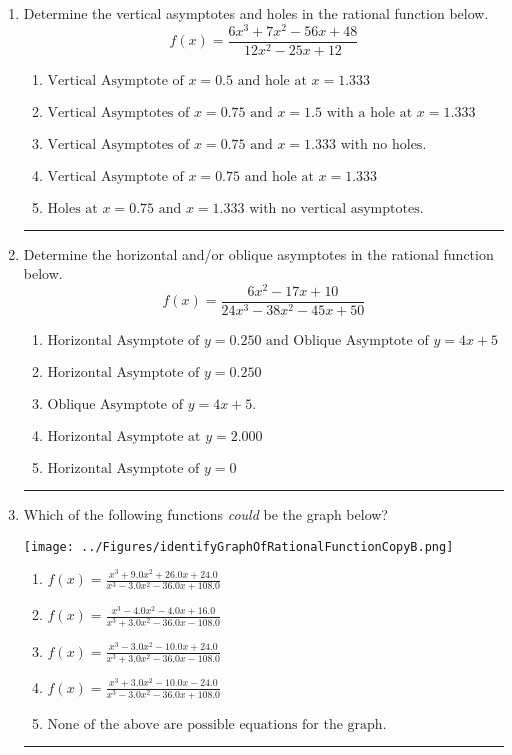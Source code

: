 \documentclass[14pt]{extbook}
\newcommand{\litem}[1]{\item#1\hspace*{-1cm}\rule{\textwidth}{0.4pt}}
\begin{document}
\begin{enumerate}
{\begin{enumerate}[label=\Alph*.]
\end{enumerate} }
\litem{
Determine the vertical asymptotes and holes in the rational function below.\[ f(x) = \frac{6x^{3} +7 x^{2} -56 x + 48}{12x^{2} -25 x + 12} \]\begin{enumerate}[label=\Alph*.]
\item \( \text{Vertical Asymptote of } x = 0.5 \text{ and hole at } x = 1.333 \)
\item \( \text{Vertical Asymptotes of } x = 0.75 \text{ and } x = 1.5 \text{ with a hole at } x = 1.333 \)
\item \( \text{Vertical Asymptotes of } x = 0.75 \text{ and } x = 1.333 \text{ with no holes.} \)
\item \( \text{Vertical Asymptote of } x = 0.75 \text{ and hole at } x = 1.333 \)
\item \( \text{Holes at } x = 0.75 \text{ and } x = 1.333 \text{ with no vertical asymptotes.} \)

\end{enumerate} }
\litem{
Determine the horizontal and/or oblique asymptotes in the rational function below.\[ f(x) = \frac{6x^{2} -17 x + 10}{24x^{3} -38 x^{2} -45 x + 50} \]\begin{enumerate}[label=\Alph*.]
\item \( \text{Horizontal Asymptote of } y = 0.250 \text{ and Oblique Asymptote of } y = 4x + 5 \)
\item \( \text{Horizontal Asymptote of } y = 0.250  \)
\item \( \text{Oblique Asymptote of } y = 4x + 5. \)
\item \( \text{Horizontal Asymptote at } y = 2.000 \)
\item \( \text{Horizontal Asymptote of } y = 0 \)

\end{enumerate} }
\litem{
Which of the following functions \textit{could} be the graph below?
\begin{center}
    \texttt{[image: ../Figures/identifyGraphOfRationalFunctionCopyB.png]}
\end{center}
\begin{enumerate}[label=\Alph*.]
\item \( f(x)=\frac{x^{3} +9.0 x^{2} +26.0 x + 24.0}{x^{3} -3.0 x^{2} -36.0 x + 108.0} \)
\item \( f(x)=\frac{x^{3} -4.0 x^{2} -4.0 x + 16.0}{x^{3} +3.0 x^{2} -36.0 x -108.0} \)
\item \( f(x)=\frac{x^{3} -3.0 x^{2} -10.0 x + 24.0}{x^{3} +3.0 x^{2} -36.0 x -108.0} \)
\item \( f(x)=\frac{x^{3} +3.0 x^{2} -10.0 x -24.0}{x^{3} -3.0 x^{2} -36.0 x + 108.0} \)
\item \( \text{None of the above are possible equations for the graph.} \)


\end{enumerate}}
\end{enumerate}
\end{document}
